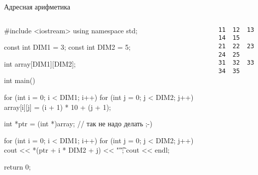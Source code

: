 \documentclass[
    9pt,
    hyperref={pdfencoding=unicode}
    ]{beamer}
\theoremstyle{definition}
\begin{document}
\begin{frame}[fragile]{Адресная арифметика}
    \footnotesize
    \begin{columns}
        \begin{column}{0.7\textwidth}
            \begin{cppcode}
                #include <iostream>        
                using namespace std;   
                
                const int DIM1 = 3;
                const int DIM2 = 5;
                
                int array[DIM1][DIM2];
                
                int main() {            
                    for (int i = 0; i < DIM1; i++) {
                        for (int j = 0; j < DIM2; j++) {
                            array[i][j] = (i + 1) * 10 + (j + 1);
                        }
                    }
                    
                    int *ptr = (int *)array;    // так не надо делать ;-)
                    
                    for (int i = 0; i < DIM1; i++) {
                        for (int j = 0; j < DIM2; j++) {
                            cout << *(ptr + i * DIM2 + j) << "\t";
                        }
                        cout << endl;
                    }
                    
                    return 0;
                }
            \end{cppcode}
        \end{column}
        \begin{column}{0.3\textwidth}
            \begin{verbatim}
11  12  13  14  15
21  22  23  24  25
31  32  33  34  35
            \end{verbatim}
        \end{column}
    \end{columns}
    
\end{frame}
\end{document}
